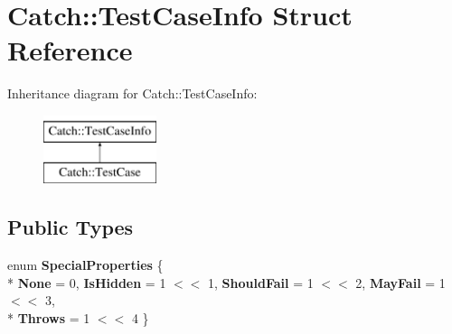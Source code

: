 \hypertarget{struct_catch_1_1_test_case_info}{\section{Catch\-:\-:Test\-Case\-Info Struct Reference}
\label{struct_catch_1_1_test_case_info}
}
Inheritance diagram for Catch\-:\-:Test\-Case\-Info\-:\begin{figure}[H]
\begin{center}
\leavevmode
\includegraphics[height=2.000000cm]{struct_catch_1_1_test_case_info}
\end{center}
\end{figure}
\subsection*{Public Types}
\begin{DoxyCompactItemize}
\item 
enum {\bfseries Special\-Properties} \{ \\*
{\bfseries None} = 0, 
{\bfseries Is\-Hidden} = 1 $<$$<$ 1, 
{\bfseries Should\-Fail} = 1 $<$$<$ 2, 
{\bfseries May\-Fail} = 1 $<$$<$ 3, 
\\*
{\bfseries Throws} = 1 $<$$<$ 4
 \}
\end{DoxyCompactItemize}
